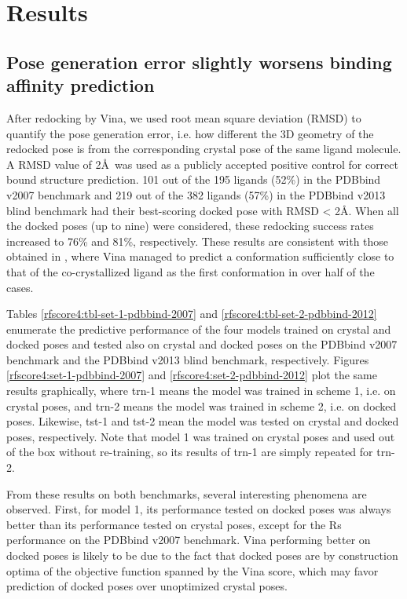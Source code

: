 \documentclass[twocolumn]{bmcart}
\begin{document}
\section*{Results}

\subsection*{Pose generation error slightly worsens binding affinity prediction}

After redocking by Vina, we used root mean square deviation (RMSD) to quantify the pose generation error, i.e. how different the 3D geometry of the redocked pose is from the corresponding crystal pose of the same ligand molecule. A RMSD value of 2\AA\ was used as a publicly accepted positive control for correct bound structure prediction. 101 out of the 195 ligands (52\%) in the PDBbind v2007 benchmark and 219 out of the 382 ligands (57\%) in the PDBbind v2013 blind benchmark had their best-scoring docked pose with RMSD < 2\AA. When all the docked poses (up to nine) were considered, these redocking success rates increased to 76\% and 81\%, respectively. These results are consistent with those obtained in \cite{1362}, where Vina managed to predict a conformation sufficiently close to that of the co-crystallized ligand as the first conformation in over half of the cases.

Tables \ref{rfscore4:tbl-set-1-pdbbind-2007} and \ref{rfscore4:tbl-set-2-pdbbind-2012} enumerate the predictive performance of the four models trained on crystal and docked poses and tested also on crystal and docked poses on the PDBbind v2007 benchmark and the PDBbind v2013 blind benchmark, respectively. Figures \ref{rfscore4:set-1-pdbbind-2007} and \ref{rfscore4:set-2-pdbbind-2012} plot the same results graphically, where trn-1 means the model was trained in scheme 1, i.e. on crystal poses, and trn-2 means the model was trained in scheme 2, i.e. on docked poses. Likewise, tst-1 and tst-2 mean the model was tested on crystal and docked poses, respectively. Note that model 1 was trained on crystal poses and used out of the box without re-training, so its results of trn-1 are simply repeated for trn-2.

From these results on both benchmarks, several interesting phenomena are observed. First, for model 1, its performance tested on docked poses was always better than its performance tested on crystal poses, except for the Rs performance on the PDBbind v2007 benchmark. Vina performing better on docked poses is likely to be due to the fact that docked poses are by construction optima of the objective function spanned by the Vina score, which may favor prediction of docked poses over unoptimized crystal poses.
\end{document}
